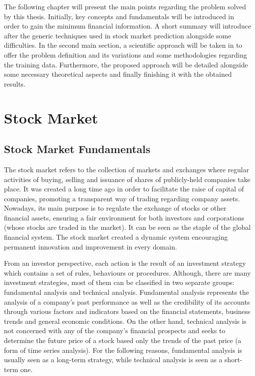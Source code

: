 The following chapter will present the main points regarding the problem solved by this thesis. Initially, key concepts and fundamentals will be introduced in order to gain the minimum financial information. A short summary will introduce after the generic techniques used in stock market prediction alongside some difficulties. In the second main section, a scientific approach will be taken in to offer the problem definition and its variations and some methodologies regarding the training data. Furthermore, the proposed approach will be detailed alongside some necessary theoretical aspects and finally finishing it with the obtained results.

\section{Stock Market}

\subsection{Stock Market Fundamentals}
The stock market refers to the collection of markets and exchanges where regular activities of buying, selling and issuance of shares of publicly-held companies take place. It was created a long time ago in order to facilitate the raise of capital of companies, promoting a transparent way of trading regarding company assets. Nowadays, its main purpose is to regulate the exchange of stocks or other financial assets, ensuring a fair environment for both investors and corporations (whose stocks are traded in the market). It can be seen as the staple of the global financial system. The stock market created a dynamic system encouraging permanent innovation and improvement in every domain.

From an investor perspective, each action is the result of an investment strategy which contains a set of rules, behaviours or procedures. Although, there are many investment strategies, most of them can be classified in two separate groups: fundamental analysis and technical analysis. Fundamental analysis represents the analysis of a company's past performance as well as the credibility of its accounts through various factors and indicators based on the financial statements, business trends and general economic conditions. On the other hand, technical analysis is not concerned with any of the company's financial prospects and seeks to determine the future price of a stock based only the trends of the past price (a form of time series analysis). For the following reasons, fundamental analysis is usually seen as a long-term strategy, while technical analysis is seen as a  short-term one.

